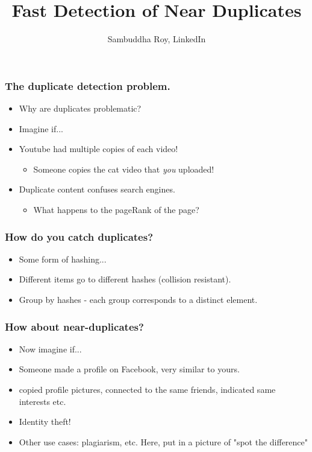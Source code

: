 \documentclass{beamer}
\title[CODS, Mar. 16, 2016] %
{Fast Detection of Near Duplicates}
\author{Sambuddha Roy, LinkedIn}
\begin{document}
\begin{frame}
  \titlepage
\end{frame}

\begin{frame}
\frametitle{The duplicate detection problem.}
\begin{itemize}
\item Why are duplicates problematic? 
\pause
\item Imagine if...
\pause
\item Youtube had multiple copies of each video!
\begin{itemize}
\item Someone copies the cat video that \textit{you} uploaded!
\end{itemize}
\pause
\item Duplicate content confuses search engines.
\begin{itemize}
\item What happens to the pageRank of the page?
\end{itemize}
\end{itemize}
\end{frame}

\begin{frame}
\frametitle{How do you catch duplicates?}
\begin{itemize}
\item Some form of hashing...
\item Different items go to different hashes (collision resistant).
\item Group by hashes - each group corresponds to a distinct element.
\end{itemize}
\end{frame}

\begin{frame}
\frametitle{How about near-duplicates?}
\begin{itemize}
\item Now imagine if...
\pause
\item Someone made a profile on Facebook, very similar to yours. 
\item copied profile pictures, \pause connected to the same friends, \pause indicated same interests \pause etc.
\pause 
\item Identity theft!
\pause
\item Other use cases: plagiarism, etc. 
\color{blue} Here, put in a picture of "spot the difference"
\end{itemize}
\end{frame}
\end{document}
